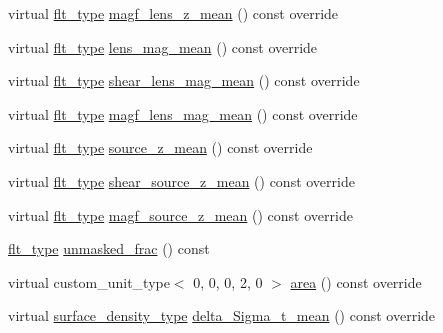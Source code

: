 \begin{DoxyCompactItemize}
\item 
virtual \hyperlink{lib_2IceBRG__main_2common_8h_ad0f130a56eeb944d9ef2692ee881ecc4}{flt\-\_\-type} \hyperlink{classIceBRG_1_1pair__bin_ac3d2072b331e60cb080c95c70df3ef1d}{magf\-\_\-lens\-\_\-z\-\_\-mean} () const override
\item 
virtual \hyperlink{lib_2IceBRG__main_2common_8h_ad0f130a56eeb944d9ef2692ee881ecc4}{flt\-\_\-type} \hyperlink{classIceBRG_1_1pair__bin_abbdc48e06437dcf104b68aece65d42a6}{lens\-\_\-mag\-\_\-mean} () const override
\item 
virtual \hyperlink{lib_2IceBRG__main_2common_8h_ad0f130a56eeb944d9ef2692ee881ecc4}{flt\-\_\-type} \hyperlink{classIceBRG_1_1pair__bin_acb5e1c7fc10545213710584bcecf1374}{shear\-\_\-lens\-\_\-mag\-\_\-mean} () const override
\item 
virtual \hyperlink{lib_2IceBRG__main_2common_8h_ad0f130a56eeb944d9ef2692ee881ecc4}{flt\-\_\-type} \hyperlink{classIceBRG_1_1pair__bin_a6cf7966055f41881da7775bd005ea704}{magf\-\_\-lens\-\_\-mag\-\_\-mean} () const override
\item 
virtual \hyperlink{lib_2IceBRG__main_2common_8h_ad0f130a56eeb944d9ef2692ee881ecc4}{flt\-\_\-type} \hyperlink{classIceBRG_1_1pair__bin_ace5421f980b509091b31fc03eda49a20}{source\-\_\-z\-\_\-mean} () const override
\item 
virtual \hyperlink{lib_2IceBRG__main_2common_8h_ad0f130a56eeb944d9ef2692ee881ecc4}{flt\-\_\-type} \hyperlink{classIceBRG_1_1pair__bin_a0caa7e96d7b30a254fdd1f7119547e06}{shear\-\_\-source\-\_\-z\-\_\-mean} () const override
\item 
virtual \hyperlink{lib_2IceBRG__main_2common_8h_ad0f130a56eeb944d9ef2692ee881ecc4}{flt\-\_\-type} \hyperlink{classIceBRG_1_1pair__bin_a26b687b2c34a8dd88dd33dd23d642efd}{magf\-\_\-source\-\_\-z\-\_\-mean} () const override
\item 
\hyperlink{lib_2IceBRG__main_2common_8h_ad0f130a56eeb944d9ef2692ee881ecc4}{flt\-\_\-type} \hyperlink{classIceBRG_1_1pair__bin_ac1c89162f70ad44b767042e16c269983}{unmasked\-\_\-frac} () const 
\item 
virtual custom\-\_\-unit\-\_\-type$<$ 0, 0, 0, 2, 0 $>$ \hyperlink{classIceBRG_1_1pair__bin_a6711847f96e596a1855d92b1b17311c7}{area} () const override
\item 
virtual \hyperlink{namespaceIceBRG_a80c597ef5ba0a32491d32a9f0083b02d}{surface\-\_\-density\-\_\-type} \hyperlink{classIceBRG_1_1pair__bin_a0debbbbb5351fc7f7049920e9c205d50}{delta\-\_\-\-Sigma\-\_\-t\-\_\-mean} () const override
\item 

\end{DoxyCompactItemize}
